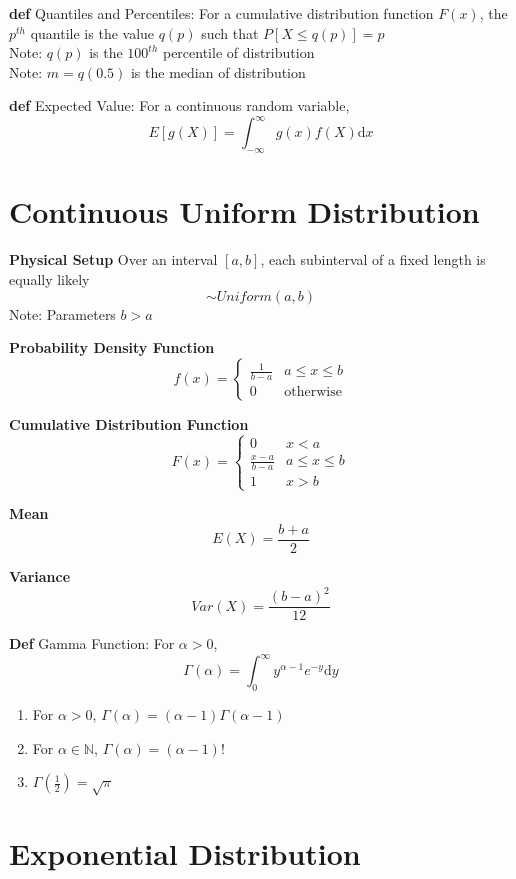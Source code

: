 \documentclass[11pt,notitlepage]{report}
\begin{document}
\textbf{def} Quantiles and Percentiles: For a cumulative distribution function $F(x)$, the $p^{th}$ quantile is the value $q(p)$ such that $P[X \leq q(p)] = p$\\
\hspace*{5mm} Note: $q(p)$ is the $100^{th}$ percentile of distribution\\
\hspace*{5mm} Note: $m = q(0.5)$ is the median of distribution

\textbf{def} Expected Value: For a continuous random variable,
$$E[g(X)] = \int_{-\infty}^\infty g(x)f(X) \mathrm{d}x$$


\section{Continuous Uniform Distribution}

\textbf{Physical Setup} Over an interval $[a, b]$, each subinterval of a fixed length is equally likely
$$\sim Uniform(a, b)$$
\hspace*{5mm} Note: Parameters $b > a$

\textbf{Probability Density Function}
$$f(x) = \begin{cases}\frac{1}{b-a} & a \leq x \leq b\\0 & \text{otherwise}\end{cases}$$

\textbf{Cumulative Distribution Function}
$$F(x) = \begin{cases}0 & x<a\\ \frac{x-a}{b-a} & a \leq x \leq b\\1 & x > b\end{cases}$$

\textbf{Mean}
$$E(X) = \frac{b+a}{2}$$

\textbf{Variance}
$$Var(X) = \frac{(b-a)^2}{12}$$

\textbf{Def} Gamma Function: For $\alpha > 0$,
$$\Gamma(\alpha) = \int_0^\infty y^{\alpha -1}e^{-y}\mathrm{d}y$$
\begin{enumerate}
    \item For $\alpha >0$, $\Gamma(\alpha) = (\alpha -1)\Gamma(\alpha -1)$
    \item For $\alpha \in \mathbb N$, $\Gamma(\alpha) = (\alpha -1)!$
    \item $\Gamma\left(\frac{1}{2}\right) = \sqrt{\pi}$
\end{enumerate}

\newpage

\section{Exponential Distribution}
\end{document}
